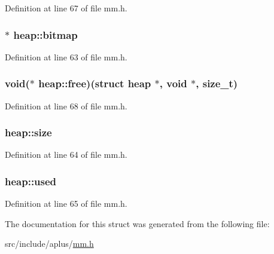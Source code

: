 Definition at line 67 of file mm.\+h.

\hypertarget{structheap_a5243ef46c552fc0968aa2bcdaf6725d1}{
\subsubsection[{bitmap}]{$\ast$ heap\+::bitmap}}\label{structheap_a5243ef46c552fc0968aa2bcdaf6725d1}


Definition at line 63 of file mm.\+h.

\hypertarget{structheap_ae53b14c50bbb9daab4346cd0873bda02}{
\subsubsection[{free}]{\setlength{\rightskip}{0pt plus 5cm}void($\ast$ heap\+::free)(struct {\bf heap} $\ast$, void $\ast$, size\+\_\+t)}}\label{structheap_ae53b14c50bbb9daab4346cd0873bda02}


Definition at line 68 of file mm.\+h.

\hypertarget{structheap_a486fb531d24b9ee5f17b7ffe96689705}{
\subsubsection[{size}]{ heap\+::size}}\label{structheap_a486fb531d24b9ee5f17b7ffe96689705}


Definition at line 64 of file mm.\+h.

\hypertarget{structheap_a37f3f6d6d39562f3cca452eafebcd7ac}{
\subsubsection[{used}]{ heap\+::used}}\label{structheap_a37f3f6d6d39562f3cca452eafebcd7ac}


Definition at line 65 of file mm.\+h.



The documentation for this struct was generated from the following file\+:\begin{DoxyCompactItemize}
\item 
src/include/aplus/\hyperlink{mm_8h}{mm.\+h}\end{DoxyCompactItemize}
